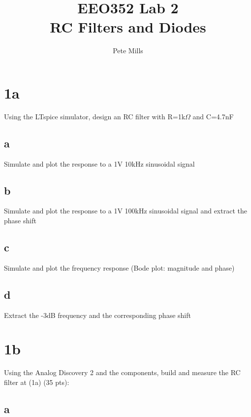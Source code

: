 \documentclass{article}
\begin{document}
	
	
	\title{EEO352 Lab 2\\RC Filters and Diodes}
	\author{Pete Mills}
	
	\maketitle
	
	\section*{1a}
	
	Using the LTspice simulator, design an RC filter with R=1k\(\Omega\) and C=4.7nF 
	
	\subsection*{a}
	
	Simulate and plot the response to a 1V 10kHz sinusoidal signal
	
	\subsection*{b} 
	
	Simulate and plot the response to a 1V 100kHz sinusoidal signal and extract the phase shift
	
	\subsection*{c}
	
	Simulate and plot the frequency response (Bode plot: magnitude and phase)
	
	\subsection*{d}
	
	Extract the -3dB frequency and the corresponding phase shift
	
	\section*{1b}
	
	Using the Analog Discovery 2 and the components, build and measure the RC filter at (1a) (35 pts):
	
	\subsection*{a}
	
\end{document}
